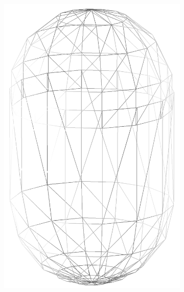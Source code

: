 \begin{figure}
\begin{center}
\begin{subfigure}{0.2\textwidth}
    \includegraphics[width=\linewidth]{assets/images/shapes/bugold/bad_mesh_med_w}
    \caption{}
    \end{subfigure}
    \begin{subfigure}{0.2\textwidth}

\end{subfigure}
\end{center}
\end{figure}
